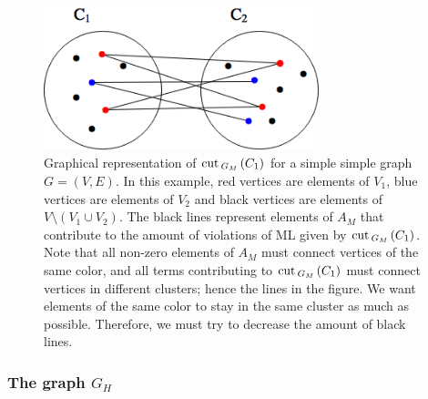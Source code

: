 \begin{figure}
\begin{center}
\includegraphics[width=8cm]{figures/gm.png}
\end{center}
   \caption[Graphical representation of $\cut_{G_M\,}(C_1)$ for a simple graph $G=(V,E)$]{Graphical representation of $\cut _{G_M\,}(C_1)$ for a simple simple graph $G = (V,E)$.  In this example, red vertices are elements of $V_1$, blue vertices are elements of $V_2$ and black vertices are elements of $V \setminus (V_1 \cup V_2)$. The black lines represent elements of $A_M$ that contribute to the amount of violations of ML given by $\cut _{G_M\,}(C_1)$. Note that all non-zero elements of $A_M$ must connect vertices of the same color, and all terms contributing to $\cut _{G_M\,}(C_1)$ must connect vertices in different clusters; hence the lines in the figure. We want elements of the same color to stay in the same cluster as much as possible. Therefore, we must try to decrease the amount of black lines.}
\label{gm}
\end{figure}

\subsubsection*{The graph $G_H$}

